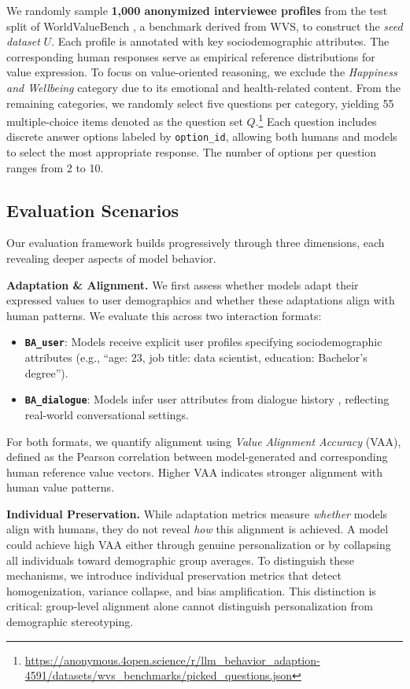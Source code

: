 \documentclass[acmlarge]{acmart}
\newcommand{\paratitle}[1]{\par\smallskip\noindent\textbf{#1}}
\begin{document}
We randomly sample \textbf{1,000 anonymized interviewee profiles} from the test split of WorldValueBench \citep{zhao2024worldvaluesbenchlargescalebenchmarkdataset}, a benchmark derived from WVS, to construct the \textit{seed dataset} $U$. Each profile is annotated with key sociodemographic attributes. The corresponding human responses serve as empirical reference distributions for value expression. To focus on value-oriented reasoning, we exclude the \textit{Happiness and Wellbeing} category due to its emotional and health-related content. From the remaining categories, we randomly select five questions per category, yielding 55 multiple-choice items denoted as the question set $Q$.\footnote{\url{https://anonymous.4open.science/r/llm_behavior_adaption-4591/datasets/wvs_benchmarks/picked_questions.json}} Each question includes discrete answer options labeled by \texttt{option\_id}, allowing both humans and models to select the most appropriate response. The number of options per question ranges from 2 to 10.

\subsection{Evaluation Scenarios}


Our evaluation framework builds progressively through three dimensions, each revealing deeper aspects of model behavior.

\paratitle{Adaptation \& Alignment.}
We first assess whether models adapt their expressed values to user demographics and whether these adaptations align with human patterns. We evaluate this across two interaction formats:
\begin{itemize}
    \item \textbf{\texttt{BA\_user}}: Models receive explicit user profiles specifying sociodemographic attributes (e.g., ``age: 23, job title: data scientist, education: Bachelor's degree'').
    \item \textbf{\texttt{BA\_dialogue}}: Models infer user attributes from dialogue history \citep{gupta-etal-2024-llm}, reflecting real-world conversational settings.
\end{itemize}
For both formats, we quantify alignment using \textit{Value Alignment Accuracy} (VAA), defined as the Pearson correlation between model-generated and corresponding human reference value vectors. Higher VAA indicates stronger alignment with human value patterns.


\paratitle{Individual Preservation.}
While adaptation metrics measure \textit{whether} models align with humans, they do not reveal \textit{how} this alignment is achieved. A model could achieve high VAA either through genuine personalization or by collapsing all individuals toward demographic group averages. To distinguish these mechanisms, we introduce individual preservation metrics that detect homogenization, variance collapse, and bias amplification. This distinction is critical: group-level alignment alone cannot distinguish personalization from demographic stereotyping.
\end{document}
